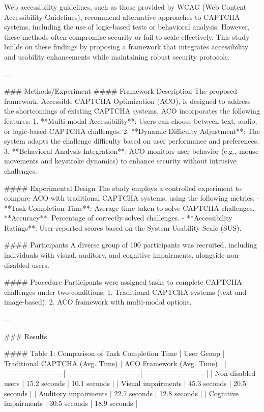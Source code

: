 Web accessibility guidelines, such as those provided by WCAG (Web Content Accessibility Guidelines), recommend alternative approaches to CAPTCHA systems, including the use of logic-based tests or behavioral analysis. However, these methods often compromise security or fail to scale effectively. This study builds on these findings by proposing a framework that integrates accessibility and usability enhancements while maintaining robust security protocols.

---

### Methods/Experiment
#### Framework Description
The proposed framework, Accessible CAPTCHA Optimization (ACO), is designed to address the shortcomings of existing CAPTCHA systems. ACO incorporates the following features:
1. **Multi-modal Accessibility**: Users can choose between text, audio, or logic-based CAPTCHA challenges.
2. **Dynamic Difficulty Adjustment**: The system adapts the challenge difficulty based on user performance and preferences.
3. **Behavioral Analysis Integration**: ACO monitors user behavior (e.g., mouse movements and keystroke dynamics) to enhance security without intrusive challenges.

#### Experimental Design
The study employs a controlled experiment to compare ACO with traditional CAPTCHA systems, using the following metrics:
- **Task Completion Time**: Average time taken to solve CAPTCHA challenges.
- **Accuracy**: Percentage of correctly solved challenges.
- **Accessibility Ratings**: User-reported scores based on the System Usability Scale (SUS).

#### Participants
A diverse group of 100 participants was recruited, including individuals with visual, auditory, and cognitive impairments, alongside non-disabled users.

#### Procedure
Participants were assigned tasks to complete CAPTCHA challenges under two conditions:
1. Traditional CAPTCHA systems (text and image-based).
2. ACO framework with multi-modal options.

---

### Results

#### Table 1: Comparison of Task Completion Time
| User Group              | Traditional CAPTCHA (Avg. Time) | ACO Framework (Avg. Time) |
|-------------------------|--------------------------------|---------------------------|
| Non-disabled users      | 15.2 seconds                 | 10.1 seconds              |
| Visual impairments      | 45.3 seconds                 | 20.5 seconds              |
| Auditory impairments    | 22.7 seconds                 | 12.8 seconds              |
| Cognitive impairments   | 30.5 seconds                 | 18.9 seconds              |


